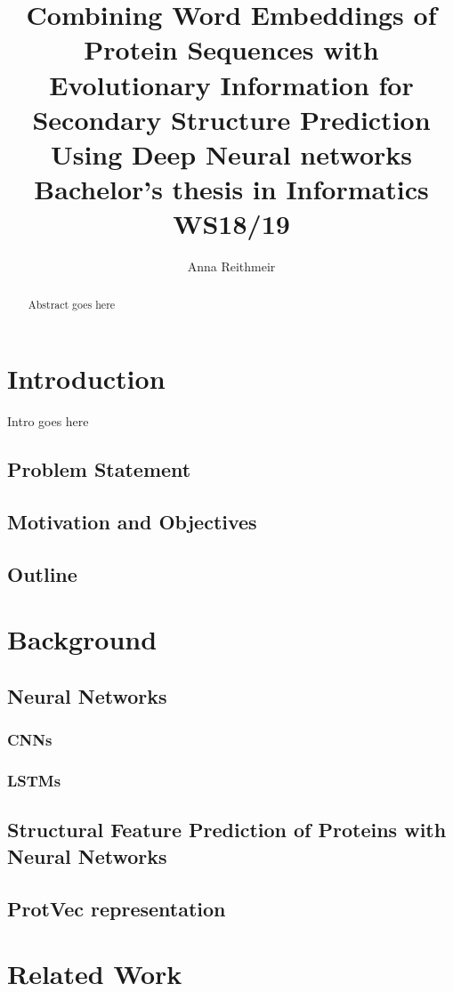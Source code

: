 \documentclass{article}
\title{Combining Word Embeddings of Protein Sequences with Evolutionary Information for Secondary Structure Prediction Using Deep Neural networks \\ Bachelor's thesis in Informatics WS18/19}
\author{Anna Reithmeir}
\begin{document}
\maketitle
\newpage
\tableofcontents
\newpage
\begin{abstract}
Abstract goes here
\end{abstract}
\newpage


\section{Introduction}
Intro goes here
\subsection{Problem Statement}
\subsection{Motivation and Objectives}
\subsection{Outline}

\section{Background}
\subsection{Neural Networks}
\subsubsection{CNNs}
\subsubsection{LSTMs}
\subsection{Structural Feature Prediction of Proteins with Neural Networks}
\subsection{ProtVec representation}

\section{Related Work}
\end{document}
